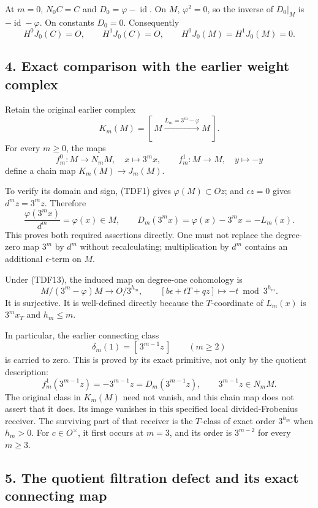 \documentclass[
  10pt,
]{article}
\begin{document}
At \(m=0\), \(N_0C=C\) and \(D_0=\varphi-\operatorname{id}\). On \(M\),
\(\varphi^2=0\), so the inverse of \(D_0|_M\) is
\(-\operatorname{id}-\varphi\). On constants \(D_0=0\). Consequently \[
 H^0J_0(C)=O,\qquad H^1J_0(C)=O,\qquad
 H^0J_0(M)=H^1J_0(M)=0.
 \tag{TDF15}
\]

\subsection{4. Exact comparison with the earlier weight
complex}\label{exact-comparison-with-the-earlier-weight-complex}

Retain the original earlier complex \[
 K_m(M)=[\,M\xrightarrow{L_m=3^m-\varphi}M\,].
\] For every \(m\geq0\), the maps \[
 f_m^0:M\longrightarrow N_mM,\quad x\longmapsto3^mx,
 \qquad
 f_m^1:M\longrightarrow M,\quad y\longmapsto-y
 \tag{TDF16}
\] define a chain map \(K_m(M)\to J_m(M)\).

To verify its domain and sign, (TDF1) gives \(\varphi(M)\subset Oz\);
and \(\epsilon z=0\) gives \(d^mz=3^mz\). Therefore \[
 \frac{\varphi(3^mx)}{d^m}=\varphi(x)\in M,
 \qquad
 D_m(3^mx)=\varphi(x)-3^mx=-L_m(x).
 \tag{TDF17}
\] This proves both required assertions directly. One must not replace
the degree-zero map \(3^m\) by \(d^m\) without recalculating;
multiplication by \(d^m\) contains an additional \(\epsilon\)-term on
\(M\).

Under (TDF13), the induced map on degree-one cohomology is \[
 M/(3^m-\varphi)M\longrightarrow O/3^{h_m},
 \qquad
 [b\epsilon+tT+qz]\longmapsto-t\bmod3^{h_m}.
 \tag{TDF18}
\] It is surjective. It is well-defined directly because the
\(T\)-coordinate of \(L_m(x)\) is \(3^m x_T\) and \(h_m\leq m\).

In particular, the earlier connecting class \[
 \delta_m(1)=[\,3^{m-1}z\,]\qquad(m\geq2)
\] is carried to zero. This is proved by its exact primitive, not only
by the quotient description: \[
 f_m^1(3^{m-1}z)=-3^{m-1}z
 =D_m(3^{m-1}z),\qquad
 3^{m-1}z\in N_mM.
 \tag{TDF19}
\] The original class in \(K_m(M)\) need not vanish, and this chain map
does not assert that it does. Its image vanishes in this specified local
divided-Frobenius receiver. The surviving part of that receiver is the
\(T\)-class of exact order \(3^{h_m}\) when \(h_m>0\). For
\(c\in O^\times\), it first occurs at \(m=3\), and its order is
\(3^{m-2}\) for every \(m\geq3\).

\subsection{5. The quotient filtration defect and its exact connecting
map}\label{the-quotient-filtration-defect-and-its-exact-connecting-map}
\end{document}
